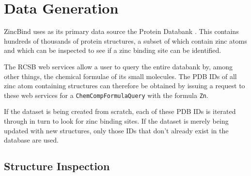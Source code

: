 \section{Data Generation}

ZincBind uses as its primary data source the Protein Databank . This contains hundreds of thousands of protein structures, a subset of which contain zinc atoms and which can be inspected to see if a zinc binding site can be identified.

The RCSB web services allow a user to query the entire databank by, among other things, the chemical formulae of its small molecules. The PDB IDs of all zinc atom containing structures can therefore be obtained by issuing a request to these web services for a \verb|ChemCompFormulaQuery| with the formula \verb|Zn|.

If the dataset is being created from scratch, each of these PDB IDs is iterated through in turn to look for zinc binding sites. If the dataset is merely being updated with new structures, only those IDs that don't already exist in the database are used.

\subsection{Structure Inspection}

